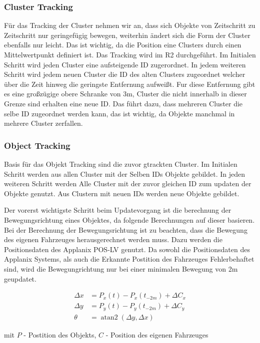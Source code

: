 \documentclass[11pt,oneside,openright]{mpreport}
\DeclareMathOperator{\atantwo}{atan2}
\begin{document}
\subsubsection{Cluster Tracking}
Für das Tracking der Cluster nehmen wir an, dass sich Objekte von Zeitschritt zu Zeitschritt nur geringefügig bewegen, weiterhin
ändert sich die Form der Cluster ebenfalls nur leicht. Das ist wichtig, da die Position eine Clusters durch einen Mittelwertpunkt definiert ist.
Das Tracking wird im R2 durchgeführt. Im Initialen Schritt wird jeden Cluster eine aufsteigende ID zugerordnet.
In jedem weiteren Schritt wird jedem neuen Cluster die ID des alten Clusters zugeordnet welcher über die Zeit hinweg die geringste Entfernung aufweißt.
Fur diese Entfernung gibt es eine großzügige obere Schranke von 3m, Cluster die nicht innerhalb in dieser Grenze sind erhalten eine neue ID.
Das führt dazu, dass mehreren Cluster die selbe ID zugeordnet werden kann, das ist wichtig, da Objekte manchmal in mehrere Cluster zerfallen.

\subsubsection{Object Tracking}
Basis für das Objekt Tracking sind die zuvor gtrackten Cluster. Im Initialen Schritt werden aus allen Cluster mit der Selben IDs Objekte gebildet.
In jeden weiteren Schritt werden Alle Cluster mit der zuvor gleichen ID zum updaten der Objekte genutzt. Aus Clustern mit neuen IDs werden neue Objekte gebildet.

Der vorerst wichtigste Schritt beim Updatevorgang ist die berechnung der Bewegungsrichtung eines Objektes, da folgende Berechnungen auf dieser basieren.
Bei der Berechnung der Bewegungsrichtung ist zu beachten, dass die Bewegung des eigenen Fahrzeuges herausgerechnet werden muss.
Dazu werden die Positionsdaten des Applanix POS-LV genutzt. Da sowohl die Positionsdaten des Applanix Systems, als auch die Erkannte Postition des Fahrzeuges Fehlerbehaftet sind,
wird die Bewegungrichtung nur bei einer minimalen Bewegung von 2m geupdatet.

\begin{align*}
\Delta x &= P_x(t) - P_x(t_{-2m}) + \Delta C_x\\
\Delta y &= P_y(t) - P_y(t_{-2m}) + \Delta C_y\\
\theta &= \atantwo(\Delta y,\Delta x)
\end{align*}

mit $P$ - Postition des Objekts, $C$ - Position des eigenen Fahrzeuges
\end{document}
